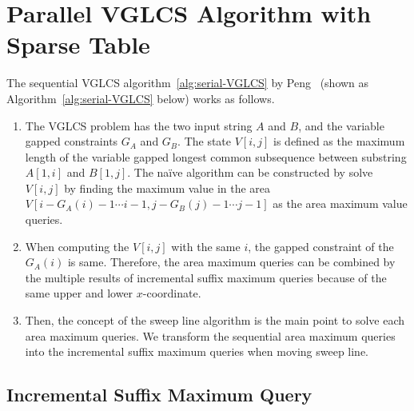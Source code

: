 \section{Parallel VGLCS Algorithm with Sparse Table} %
\label{sec:parallelVGLCS}


The sequential VGLCS algorithm~\ref{alg:serial-VGLCS} by
Peng~\cite{Peng2011TheLC} (shown as Algorithm~\ref{alg:serial-VGLCS}
below) works as follows.  

\begin{enumerate}
  \item 

The VGLCS problem has the two input string $A$ and $B$, and the variable
gapped constraints $G_A$ and $G_B$.  The state $V[i, j]$ is defined as
the maximum length of the variable gapped longest common subsequence
between substring $A[1, i]$ and $B[1, j]$.  The na\"{i}ve algorithm can
be constructed by solve $V[i, j]$ by finding the maximum value in the
area $V[i-G_A(i)-1 \cdots i-1, j-G_B(j)-1 \cdots j-1]$ as the area
maximum value queries.

  \item 

When computing the $V[i, j]$ with the same $i$, the gapped constraint of
the $G_A(i)$ is same.  Therefore, the area maximum queries can be
combined by the multiple results of incremental suffix maximum queries
because of the same upper and lower $x$-coordinate.

  \item 

Then, the concept of the sweep line algorithm is the main point to solve
each area maximum queries.  We transform the sequential area maximum
queries into the incremental suffix maximum queries when moving sweep
line.


\end{enumerate}





\subsection{Incremental Suffix Maximum Query}

